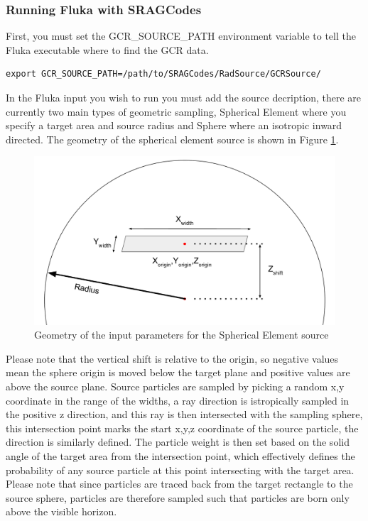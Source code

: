 \subsubsection*{Running Fluka with SRAGCodes}
First, you must set the GCR\_SOURCE\_PATH environment variable to tell the Fluka executable where to find the GCR data. 
\begin{lstlisting}
export GCR_SOURCE_PATH=/path/to/SRAGCodes/RadSource/GCRSource/
\end{lstlisting}
In the Fluka input you wish to run you must add the source decription, there are currently two main types of 
geometric sampling, Spherical Element where you specify a target area and source radius and Sphere where an isotropic
inward directed. The geometry of the spherical element source is shown in Figure \ref{fig:spherical_element}.

\begin{figure}[ht!]
 \begin{centering}
 \centering
 \includegraphics[width=0.6\paperwidth]{../figs/spherical_element_source.png}
 \caption{Geometry of the input parameters for the Spherical Element source}
 \label{fig:spherical_element}
 \end{centering}
\end{figure}
Please note that the vertical shift is relative to the origin, so negative values mean the sphere origin is moved below the target plane
and positive values are above the source plane. Source particles are sampled by picking a random x,y coordinate in the range of the 
widths, a ray direction is istropically sampled in the positive z direction, and this ray is then intersected with the sampling sphere, 
this intersection point marks the start x,y,z coordinate of the source particle, the direction is similarly defined. The particle weight
is then set based on the solid angle of the target area from the intersection point, which effectively defines the probability of 
any source particle at this point intersecting with the target area. Please note that since particles are traced back from the target 
rectangle to the source sphere, particles are therefore sampled such that particles are born only above the visible horizon.  

